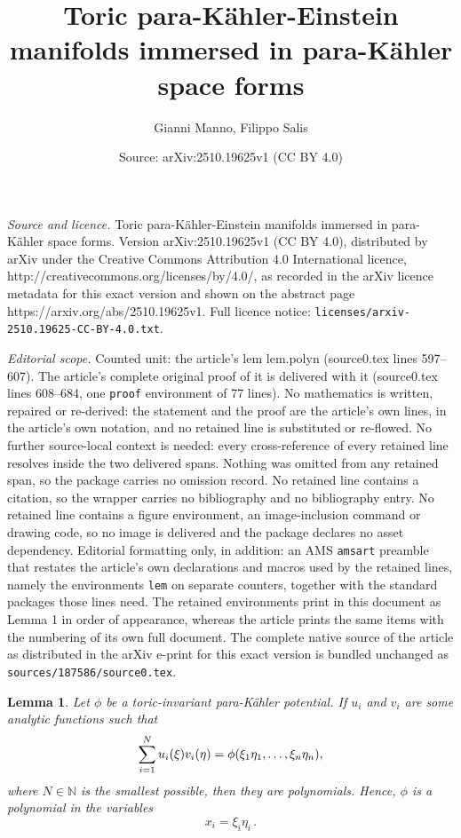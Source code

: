 \documentclass[10pt,a4paper]{amsart}
\title{Toric para-K\"{a}hler-Einstein manifolds immersed in para-K\"{a}hler space forms}
\author{Gianni Manno, Filippo Salis}
\date{Source: arXiv:2510.19625v1 (CC BY 4.0)}
\newtheorem{lem}{Lemma}
\newcommand{\N}{\mathds{N}}
\newcommand{\pk }{para-K\"{a}hler }
\begin{document}
\maketitle

\noindent\emph{Source and licence.} Toric para-K\"{a}hler-Einstein manifolds immersed in para-K\"{a}hler space forms. Version arXiv:2510.19625v1 (CC BY 4.0), distributed by arXiv under the Creative Commons Attribution 4.0 International licence, http://creativecommons.org/licenses/by/4.0/, as recorded in the arXiv licence metadata for this exact version and shown on the abstract page https://arxiv.org/abs/2510.19625v1. Full licence notice: \texttt{licenses/arxiv-2510.19625-CC-BY-4.0.txt}.\par\smallskip

\noindent\textit{Editorial scope.} Counted unit: the article's lem lem.polyn (source0.tex lines 597--607). The article's complete original proof of it is delivered with it (source0.tex lines 608--684, one \texttt{proof} environment of 77 lines). No mathematics is written, repaired or re-derived: the statement and the proof are the article's own lines, in the article's own notation, and no retained line is substituted or re-flowed.  No further source-local context is needed: every cross-reference of every retained line resolves inside the two delivered spans.  Nothing was omitted from any retained span, so the package carries no omission record.  No retained line contains a citation, so the wrapper carries no bibliography and no bibliography entry.  No retained line contains a figure environment, an image-inclusion command or drawing code, so no image is delivered and the package declares no asset dependency.  Editorial formatting only, in addition: an AMS \texttt{amsart} preamble that restates the article's own declarations and macros used by the retained lines, namely the environments \texttt{lem} on separate counters, together with the standard packages those lines need.  The retained environments print in this document as Lemma 1 in order of appearance, whereas the article prints the same items with the numbering of its own full document.  The complete native source of the article as distributed in the arXiv e-print for this exact version is bundled unchanged as \texttt{sources/187586/source0.tex}.
\begin{lem}\label{lem.polyn}
Let $\phi$ be a toric-invariant \pk potential.
If $u_i$ and $v_i$ are some analytic functions such that
\begin{equation}\label{eq:1}
\sum_{i=1}^N u_i(\xi)v_i(\eta)=\phi(\xi_1\eta_1,\mathellipsis,\xi_n\eta_n),\end{equation}
where  $N\in\N$ is the smallest possible,
then they are polynomials. Hence, $\phi$ is a polynomial in the variables 
\begin{equation}\label{eq.x.xi.eta}
x_i=\xi_i\eta_i\,.
\end{equation}
\end{lem}
\end{document}

